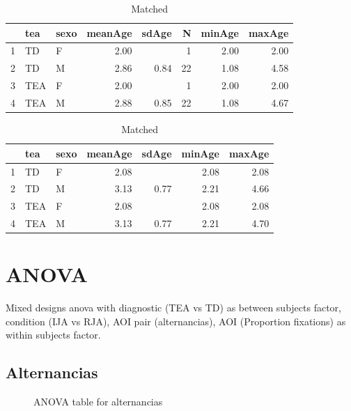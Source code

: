 \documentclass{article}
\begin{document}
\begin{table}[ht]
\caption{Matched}
\centering
\begin{tabular}{rllrrrrr}
  \hline
 & tea & sexo & meanAge & sdAge & N & minAge & maxAge \\ 
  \hline
1 & TD & F & 2.00 &  &   1 & 2.00 & 2.00 \\ 
  2 & TD & M & 2.86 & 0.84 &  22 & 1.08 & 4.58 \\ 
  3 & TEA & F & 2.00 &  &   1 & 2.00 & 2.00 \\ 
  4 & TEA & M & 2.88 & 0.85 &  22 & 1.08 & 4.67 \\ 
   \hline
\end{tabular}
\end{table}



\begin{table}[H]
\caption{Matched}
\centering
\begin{tabular}{rllrrrr}
  \hline
  & tea & sexo & meanAge & sdAge & minAge & maxAge \\ 
  \hline
  1 & TD & F & 2.08 &  & 2.08 & 2.08 \\ 
  2 & TD & M & 3.13 & 0.77 & 2.21 & 4.66 \\ 
  3 & TEA & F & 2.08 &  & 2.08 & 2.08 \\ 
  4 & TEA & M & 3.13 & 0.77 & 2.21 & 4.70 \\ 
   \hline
\end{tabular}
\end{table}

\section{ANOVA}

Mixed designs anova with diagnostic (TEA vs TD) as between subjects factor, condition (IJA vs RJA), AOI pair (alternancias), AOI (Proportion fixations) as within subjects factor.

\subsection{Alternancias}

\begin{figure}[H]
  \caption{ANOVA table for alternancias}
  \noindent{}
  \centering
\end{figure}
\end{document}
